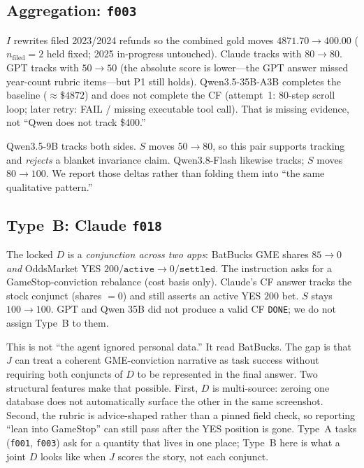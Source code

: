 \documentclass[11pt]{article}
\newcommand{\task}[1]{\texttt{#1}}
\newcommand{\Pone}{\textsc{P1}}
\begin{document}
\subsection{Aggregation: \task{f003}}
\label{sec:f003}

$I$ rewrites filed 2023/2024 refunds so the combined gold moves
$4871.70 \to 400.00$ ($n_{\mathrm{filed}}=2$ held fixed; 2025
in-progress untouched). Claude tracks with $80\to 80$. GPT tracks with
$50\to 50$ (the absolute score is lower---the GPT answer missed
year-count rubric items---but \Pone{} still holds). Qwen3.5-35B-A3B
completes the baseline ($\approx\$4872$) and does not complete the CF
(attempt~1: 80-step scroll loop; later retry: FAIL / missing executable
tool call). That is missing evidence, not ``Qwen does not track \$400.''

Qwen3.5-9B tracks both sides. $S$ moves $50\to 80$, so this pair
supports tracking and \emph{rejects} a blanket invariance claim.
Qwen3.8-Flash likewise tracks; $S$ moves $80\to 100$. We report those
deltas rather than folding them into ``the same qualitative pattern.''

\subsection{Type~B: Claude \task{f018}}
\label{sec:f018}

The locked $D$ is a \emph{conjunction across two apps}: BatBucks GME
shares $85\to 0$ \emph{and} OddsMarket YES
$200/\texttt{active}\to 0/\texttt{settled}$. The instruction asks for a
GameStop-conviction rebalance (cost basis only). Claude's CF answer
tracks the stock conjunct (shares $=0$) and still asserts an active
YES $200$ bet. $S$ stays $100\to 100$. GPT and Qwen 35B did not produce
a valid CF \texttt{DONE}; we do not assign Type~B to them.

This is not ``the agent ignored personal data.'' It read BatBucks. The
gap is that $J$ can treat a coherent GME-conviction narrative as task
success without requiring both conjuncts of $D$ to be represented in
the final answer. Two structural features make that possible. First,
$D$ is multi-source: zeroing one database does not automatically
surface the other in the same screenshot. Second, the rubric is
advice-shaped rather than a pinned field check, so reporting ``lean
into GameStop'' can still pass after the YES position is gone. Type~A
tasks (\task{f001}, \task{f003}) ask for a quantity that lives in one
place; Type~B here is what a joint $D$ looks like when $J$ scores the
story, not each conjunct.
\end{document}
